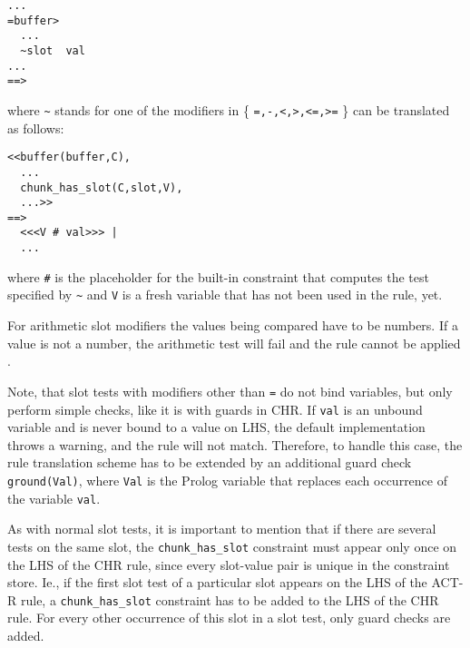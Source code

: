 \begin{lstlisting}
...
=buffer>
  ...
  ~slot  val
...
==>
\end{lstlisting}

where \verb|~| stands for one of the modifiers in \{ \verb|=,-,<,>,<=,>=| \} can be translated as follows:

\begin{lstlisting}
<<buffer(buffer,C),
  ...
  chunk_has_slot(C,slot,V),
  ...>>
==>
  <<<V # val>>> |
  ...
\end{lstlisting}

where \verb|#| is the placeholder for the built-in constraint that computes the test specified by \verb|~| and \verb|V| is a fresh variable that has not been used in the rule, yet.

For arithmetic slot modifiers the values being compared have to be numbers. If a value is not a number, the arithmetic test will fail and the rule cannot be applied \cite{actr_reference}.

Note, that slot tests with modifiers other than \verb|=| do not bind variables, but only perform simple checks, like it is with guards in CHR. If \verb|val| is an unbound variable and is never bound to a value on LHS, the default implementation throws a warning, and the rule will not match. Therefore, to handle this case, the rule translation scheme has to be extended by an additional guard check \verb|ground(Val)|, where \verb|Val| is the Prolog variable that replaces each occurrence of the variable \verb|val|.

As with normal slot tests, it is important to mention that if there are several tests on the same slot, the \verb|chunk_has_slot| constraint must appear only once on the LHS of the CHR rule, since every slot-value pair is unique in the constraint store. Ie., if the first slot test of a particular slot appears on the LHS of the ACT-R rule, a \verb|chunk_has_slot| constraint has to be added to the LHS of the CHR rule. For every other occurrence of this slot in a slot test, only guard checks are added.

